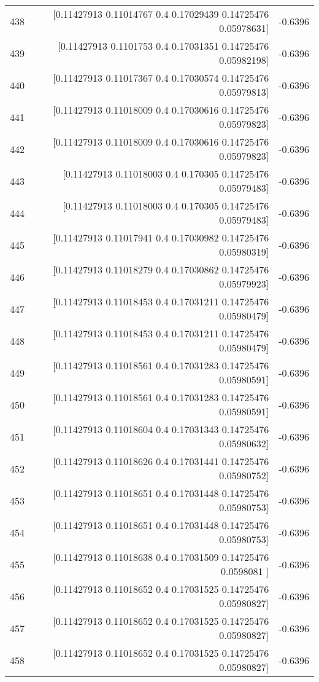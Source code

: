 \begin{longtable}{lrr}
438 & [0.11427913 0.11014767 0.4        0.17029439 0.14725476 0.05978631] & -0.6396 \\
439 & [0.11427913 0.1101753  0.4        0.17031351 0.14725476 0.05982198] & -0.6396 \\
440 & [0.11427913 0.11017367 0.4        0.17030574 0.14725476 0.05979813] & -0.6396 \\
441 & [0.11427913 0.11018009 0.4        0.17030616 0.14725476 0.05979823] & -0.6396 \\
442 & [0.11427913 0.11018009 0.4        0.17030616 0.14725476 0.05979823] & -0.6396 \\
443 & [0.11427913 0.11018003 0.4        0.170305   0.14725476 0.05979483] & -0.6396 \\
444 & [0.11427913 0.11018003 0.4        0.170305   0.14725476 0.05979483] & -0.6396 \\
445 & [0.11427913 0.11017941 0.4        0.17030982 0.14725476 0.05980319] & -0.6396 \\
446 & [0.11427913 0.11018279 0.4        0.17030862 0.14725476 0.05979923] & -0.6396 \\
447 & [0.11427913 0.11018453 0.4        0.17031211 0.14725476 0.05980479] & -0.6396 \\
448 & [0.11427913 0.11018453 0.4        0.17031211 0.14725476 0.05980479] & -0.6396 \\
449 & [0.11427913 0.11018561 0.4        0.17031283 0.14725476 0.05980591] & -0.6396 \\
450 & [0.11427913 0.11018561 0.4        0.17031283 0.14725476 0.05980591] & -0.6396 \\
451 & [0.11427913 0.11018604 0.4        0.17031343 0.14725476 0.05980632] & -0.6396 \\
452 & [0.11427913 0.11018626 0.4        0.17031441 0.14725476 0.05980752] & -0.6396 \\
453 & [0.11427913 0.11018651 0.4        0.17031448 0.14725476 0.05980753] & -0.6396 \\
454 & [0.11427913 0.11018651 0.4        0.17031448 0.14725476 0.05980753] & -0.6396 \\
455 & [0.11427913 0.11018638 0.4        0.17031509 0.14725476 0.0598081 ] & -0.6396 \\
456 & [0.11427913 0.11018652 0.4        0.17031525 0.14725476 0.05980827] & -0.6396 \\
457 & [0.11427913 0.11018652 0.4        0.17031525 0.14725476 0.05980827] & -0.6396 \\
458 & [0.11427913 0.11018652 0.4        0.17031525 0.14725476 0.05980827] & -0.6396 \\

\end{longtable}

